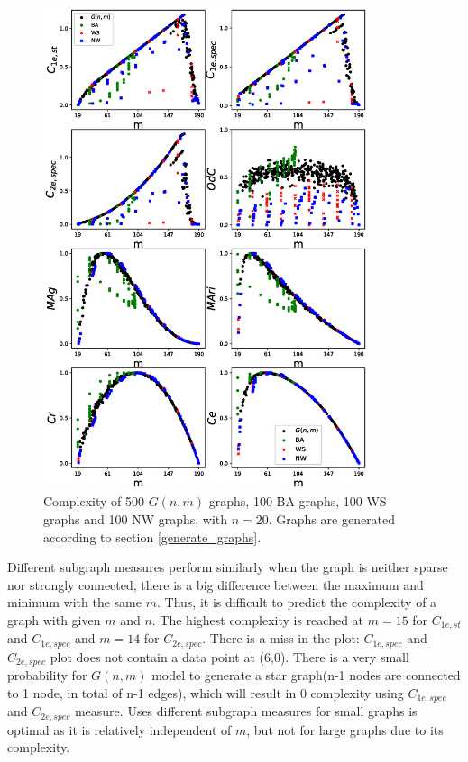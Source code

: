 \documentclass[12pt]{article}
\begin{document}
\begin{figure}[p!]
    \centering
    \vspace*{-2in}
    \includegraphics[width = 0.85\textwidth]{complexities_sp.eps}
    \vspace*{-0.8in}
    \caption{Complexity of 500 $G(n,m)$ graphs, 100 BA graphs, 100 WS graphs and 100 NW graphs, with $n=20$. Graphs are generated according to section \ref{generate_graphs}.}
    \label{fig:graph_models}
\end{figure}

Different subgraph measures perform similarly when the graph is neither sparse nor strongly connected, there is a big difference between the maximum and minimum with the same $m$. Thus, it is difficult to predict the complexity of a graph with given $m$ and $n$. The highest complexity is reached at $m=15$ for $C_{1e,st}$ and $C_{1e,spec}$ and $m=14$ for $C_{2e,spec}$. There is a miss in the plot: $C_{1e,spec}$ and $C_{2e,spec}$ plot does not contain a data point at (6,0). There is a very small probability for $G(n,m)$ model to generate a star graph(n-1 nodes are connected to 1 node, in total of n-1 edges), which will result in 0 complexity using $C_{1e,spec}$ and $C_{2e,spec}$ measure. Uses different subgraph measures for small graphs is optimal as it is relatively independent of $m$, but not for large graphs due to its complexity.\par
\end{document}
